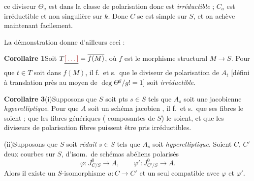 \documentclass[11pt,a4paper]{article}
\begin{document}

ce diviseur $\Theta_{a}$ est dans la classe de polarisation donc est
\emph{irréductible} ;  $C_{a}$ est irréductible et non singulière
sur $k$. Donc $C$ se  est simple sur $S$, et on
achève maintenant facilement.

La démonstration donne d'ailleurs ceci :

 \textbf{Corollaire 1}\quad Soit $T \struck{\ill{}} =
\overline{f(M)}$, où $f$ est le morphisme structural $M \to S$. Pour que $t
\in T$ soit dans $f(M)$, il f.\ et s.\ que le diviseur de polarisation de
$A_{t}$ [défini à translation près au moyen de $\deg \Theta^{g}/g! = 1$] soit
 \emph{irréductible}.




\textbf{Corollaire 3}\quad (i)\quad Supposons que $S$ soit 
 \struck{\ill{}} \ill{} pts $s \in S$ tels que $A_{s}$ soit une
jacobienne \struck{\ill{}} \emph{hyperelliptique}. Pour que $A$ soit un schéma
jacobien , il f.\ et s.\ que ses fibres le soient ; \ill{} \ill{}
que les fibres génériques \ill{} \ill{} (\ill{} composantes de $S$) le soient,
et que les diviseurs de polarisation   fibres
puissent être pris irréductibles.


\marginal{\ill{} \ill{} \ill{}}


(ii)\quad Supposons que $S$ soit \emph{réduit} \ill{} \struck{\ill{}} $s \in
S$ tels que $A_{s}$ soit \emph{hyperelliptique}. Soient $C$, $C'$ deux courbes
sur $S$,  d'isom.\ de schémas abéliens polarisés
\[
  \varphi : J^{0}_{C/S} \longrightarrow A,
  \qquad
  \varphi' : J^{0}_{C'/S} \longrightarrow A.
\]
Alors il existe un $S$-isomorphisme $u : C \to C'$ et un seul 
compatible avec $\varphi$ et $\varphi'$.

\end{document}
